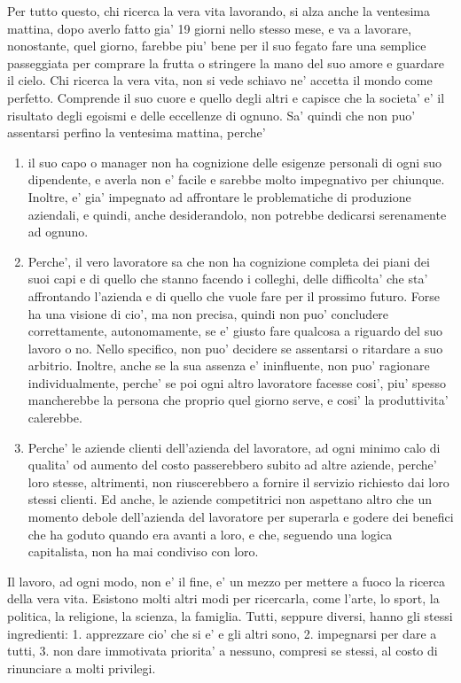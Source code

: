 Per tutto questo, chi ricerca la vera vita lavorando, si alza anche la ventesima mattina, dopo averlo fatto gia' 19 giorni nello stesso mese, e va a lavorare, nonostante, quel giorno, farebbe piu' bene per il suo fegato fare una semplice passeggiata per comprare la frutta o stringere la mano del suo amore e guardare il cielo. Chi ricerca la vera vita, non si vede schiavo ne' accetta il mondo come perfetto. Comprende il suo cuore e quello degli altri e capisce che la societa' e' il risultato degli egoismi e delle eccellenze di ognuno. Sa' quindi che non puo' assentarsi perfino la ventesima mattina, perche'
\begin{enumerate}
    \item il suo capo o manager non ha cognizione delle esigenze personali di ogni suo dipendente, e averla non e' facile e sarebbe molto impegnativo per chiunque. Inoltre, e' gia' impegnato ad affrontare le problematiche di produzione aziendali, e quindi, anche desiderandolo, non potrebbe dedicarsi serenamente ad ognuno.
    \item Perche', il vero lavoratore sa che non ha cognizione completa dei piani dei suoi capi e di quello che stanno facendo i colleghi, delle difficolta' che sta' affrontando l'azienda e di quello che vuole fare per il prossimo futuro.
   Forse ha una visione di cio', ma non precisa, quindi non puo' concludere correttamente, autonomamente, se e' giusto fare qualcosa a riguardo del suo lavoro o no. Nello specifico, non puo' decidere se assentarsi o ritardare a suo arbitrio. Inoltre, anche se la sua assenza e' ininfluente, non puo' ragionare individualmente, perche' se poi ogni altro lavoratore facesse cosi', piu' spesso mancherebbe la persona che proprio quel giorno serve, e cosi' la produttivita' calerebbe.
    \item Perche' le aziende clienti dell'azienda del lavoratore, ad ogni minimo calo di qualita' od aumento del costo passerebbero subito ad altre aziende, perche' loro stesse, altrimenti, non riuscerebbero a fornire il servizio richiesto dai loro stessi clienti. Ed anche, le aziende competitrici non aspettano altro che un momento debole dell'azienda del lavoratore per superarla e godere dei benefici che ha goduto quando era avanti a loro, e che, seguendo una logica capitalista, non ha mai condiviso con loro.

\end{enumerate}
Il lavoro, ad ogni modo, non e' il fine, e' un mezzo per mettere a fuoco la ricerca della vera vita. Esistono molti altri modi per ricercarla, come l'arte, lo sport, la politica, la religione, la scienza, la famiglia. Tutti, seppure diversi, hanno gli stessi ingredienti: 1. apprezzare cio' che si e' e gli altri sono, 2. impegnarsi per dare a tutti, 3. non dare immotivata priorita' a nessuno, compresi se stessi, al costo di rinunciare a molti privilegi.

